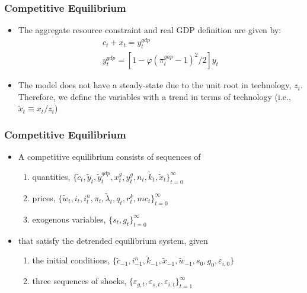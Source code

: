 \documentclass[11pt]{beamer}
\begin{document}
\begin{frame}\frametitle{Competitive Equilibrium}\setlength{\itemindent}{-1.2em}
\begin{itemize} \setlength{\itemsep}{8pt}
\item The aggregate resource constraint and real GDP definition are given by:
\begin{gather*}
  c_t + x_t = y_t^{gdp}\\
  y_t^{gdp} = [1 - \varphi(\pi_t^{gap}-1)^2/2]y_t
\end{gather*}
\item The model does not have a steady-state due to the unit root in technology, $z_t$. Therefore, we define the variables with a trend in terms of technology (i.e., $\tilde{x}_t \equiv x_t/z_t$)
\end{itemize}
\end{frame}
\begin{frame}\frametitle{Competitive Equilibrium}
\begin{itemize} \setlength{\itemsep}{10pt}
\item A competitive equilibrium consists of sequences of 
\begin{enumerate} \setlength{\itemsep}{5pt}
\item quantities, $\{\tilde{c}_t, \tilde{y}_t, \tilde{y}_t^{gdp}, x^g_t, y^g_t, n_t, \tilde{k}_t, \tilde{x}_t\}_{t=0}^\infty$ \item prices, $\{\tilde{w}_t, i_t, i^n_t, \pi_t, \tilde{\lambda}_t, q_t, r^k_t, mc_t\}_{t=0}^\infty$
\item exogenous variables, $\{s_t,g_t\}_{t=0}^\infty$
\end{enumerate}
\item that satisfy the detrended equilibrium system, given 
\begin{enumerate}\setlength{\itemsep}{5pt}
\item the initial conditions, $\{\tilde{c}_{-1}, i^n_{-1}, \tilde{k}_{-1}, \tilde{x}_{-1}, \tilde{w}_{-1}, s_0, g_0, \varepsilon_{i,0}\}$
\item three sequences of shocks, $\{\varepsilon_{g,t}, \varepsilon_{s,t}, \varepsilon_{i,t}\}_{t=1}^\infty$
\end{enumerate}
\end{itemize}
\end{frame}
\end{document}
